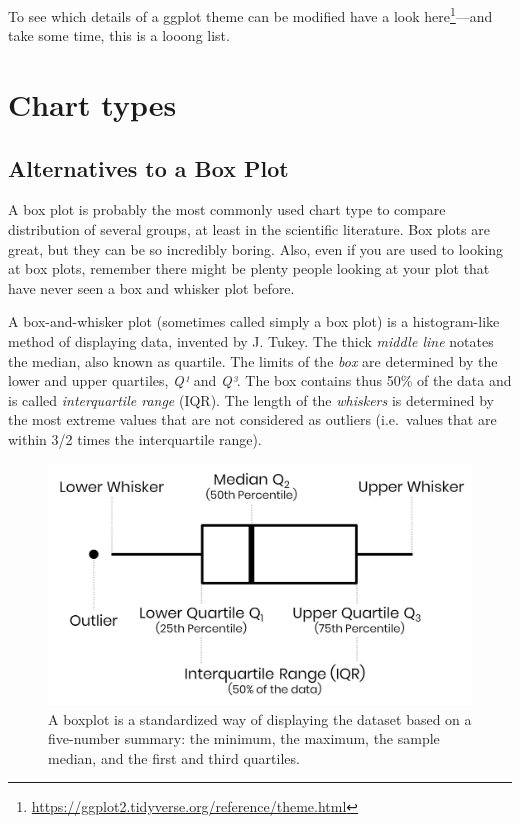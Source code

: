 \documentclass[
]{krantz}
\renewcommand{\href}[2]{#2\footnote{\url{#1}}}
\begin{document}
To see which details of a ggplot theme can be modified have a look \href{https://ggplot2.tidyverse.org/reference/theme.html}{here}---and take some time, this is a looong list.

\hypertarget{charts}{%
\chapter{Chart types}\label{charts}}

\hypertarget{alternatives-to-a-box-plot}{%
\section{Alternatives to a Box Plot}\label{alternatives-to-a-box-plot}}

A box plot is probably the most commonly used chart type to compare distribution of several groups, at least in the scientific literature. Box plots are great, but they can be so incredibly boring. Also, even if you are used to looking at box plots, remember there might be plenty people looking at your plot that have never seen a box and whisker plot before.

A box-and-whisker plot (sometimes called simply a box plot) is a histogram-like method of displaying data, invented by J. Tukey. The thick \emph{middle line} notates the median, also known as quartile. The limits of the \emph{box} are determined by the lower and upper quartiles, \emph{Q¹} and \emph{Q³}. The box contains thus 50\% of the data and is called \emph{interquartile range} (IQR). The length of the \emph{whiskers} is determined by the most extreme values that are not considered as outliers (i.e.~values that are within 3/2 times the interquartile range).

\begin{figure}
\includegraphics[width=1\linewidth]{img/boxplot} \caption{A boxplot is a standardized way of displaying the dataset based on a five-number summary: the minimum, the maximum, the sample median, and the first and third quartiles.}\label{fig:img-boxplot}
\end{figure}
\end{document}
